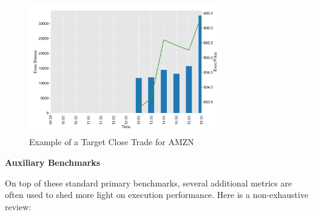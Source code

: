 	\begin{figure}[!ht]
	\centering
	\includegraphics[width=0.75\textwidth]{chapters/chapter_exec_models/figures/close.png} 
	\caption{Example of a Target Close Trade for AMZN \label{fig:close}}
	\end{figure}


\noindent\textbf{Auxiliary Benchmarks} 

On top of these standard primary benchmarks, several additional metrics are often used to shed more light on execution performance. Here is a non-exhaustive review:

